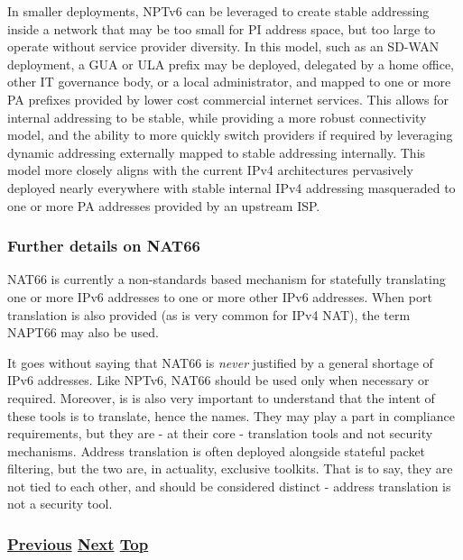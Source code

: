 \documentclass[
]{article}
\begin{document}
In smaller deployments, NPTv6 can be leveraged to create stable
addressing inside a network that may be too small for PI address space,
but too large to operate without service provider diversity. In this
model, such as an SD-WAN deployment, a GUA or ULA prefix may be
deployed, delegated by a home office, other IT governance body, or a
local administrator, and mapped to one or more PA prefixes provided by
lower cost commercial internet services. This allows for internal
addressing to be stable, while providing a more robust connectivity
model, and the ability to more quickly switch providers if required by
leveraging dynamic addressing externally mapped to stable addressing
internally. This model more closely aligns with the current IPv4
architectures pervasively deployed nearly everywhere with stable
internal IPv4 addressing masqueraded to one or more PA addresses
provided by an upstream ISP.

\subsubsection{Further details on NAT66}\label{further-details-on-nat66}

NAT66 is currently a non-standards based mechanism for statefully
translating one or more IPv6 addresses to one or more other IPv6
addresses. When port translation is also provided (as is very common for
IPv4 NAT), the term NAPT66 may also be used.

It goes without saying that NAT66 is \emph{never} justified by a general
shortage of IPv6 addresses. Like NPTv6, NAT66 should be used only when
necessary or required. Moreover, is is also very important to understand
that the intent of these tools is to translate, hence the names. They
may play a part in compliance requirements, but they are - at their core
- translation tools and not security mechanisms. Address translation is
often deployed alongside stateful packet filtering, but the two are, in
actuality, exclusive toolkits. That is to say, they are not tied to each
other, and should be considered distinct - address translation is not a
security tool.

\subsubsection{\texorpdfstring{\hyperref[tunnels]{Previous}
\hyperref[obsolete-techniques]{Next}
\hyperref[coexistence-with-legacy-ipv4]{Top}}{Previous Next Top}}\label{previous-next-top-21}
\end{document}
